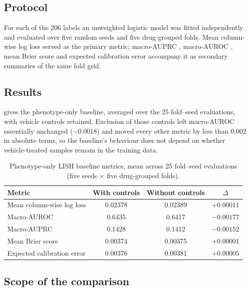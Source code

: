 \documentclass[11pt,a4paper]{article}
\begin{document}
\subsection{Protocol}

For each of the \num{206} labels an unweighted logistic model was fitted independently and evaluated over five random seeds and five drug-grouped folds. Mean column-wise log loss served as the primary metric; macro-AUPRC \citep{davis2006auprc}, macro-AUROC \citep{bmj2006rocauc}, mean Brier score and expected calibration error \citep{natoesci2017ece} accompany it as secondary summaries of the same fold grid.

\subsection{Results}
\label{sec:lish_si_results}

 gives the phenotype-only baseline, averaged over the \num{25} fold--seed evaluations, with vehicle controls retained. Exclusion of those controls left macro-AUROC essentially unchanged ($-\num{0.0018}$) and moved every other metric by less than \num{0.002} in absolute terms, so the baseline's behaviour does not depend on whether vehicle-treated samples remain in the training data.

\begin{table}[h]
\centering
\caption{Phenotype-only LISH baseline metrics, mean across \num{25} fold--seed evaluations (five seeds $\times$ five drug-grouped folds).}
\label{tab:lish_metrics}
\begin{tabular}{lccc}
\toprule
Metric & With controls & Without controls & $\Delta$ \\
\midrule
Mean column-wise log loss & \num{0.02378} & \num{0.02389} & $+\num{0.00011}$ \\
Macro-AUROC & \num{0.6435} & \num{0.6417} & $-\num{0.00177}$ \\
Macro-AUPRC & \num{0.1428} & \num{0.1412} & $-\num{0.00152}$ \\
Mean Brier score & \num{0.00374} & \num{0.00375} & $+\num{0.00001}$ \\
Expected calibration error & \num{0.00376} & \num{0.00381} & $+\num{0.00005}$ \\
\bottomrule
\end{tabular}
\end{table}

\subsection{Scope of the comparison}
\end{document}
